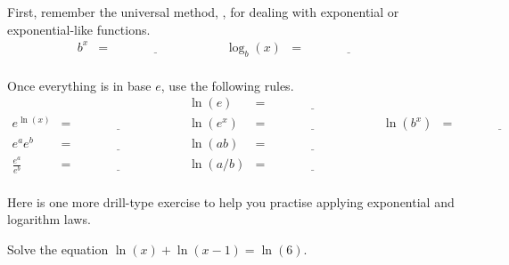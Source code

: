 \documentclass[../main.tex]{subfiles}
\begin{document}
\begin{exercise}
  First, remember the universal method, , for dealing with exponential or exponential-like functions.
  \[
    \begin{array}{rclcrcl}
      b^{x} &=& \underline{\hspace{1in}}
      &\hspace{1em} &
      \log_{b}(x) &=& \underline{\hspace{1in}} \\[2ex]
    \end{array}
  \]

  Once everything is in base \(e\), use the following rules.
  \[
    \begin{array}{rclcrclcrcl}
      && & &
      \ln(e) &=& \underline{\hspace{1in}} &\hspace{1em} & \\[2ex]
      e^{\ln(x)} &=& \underline{\hspace{1in}}
      &\hspace{1em} &
      \ln(e^{x}) &=& \underline{\hspace{1in}}
      &\hspace{1em} &
      \ln(b^{x}) &=& \underline{\hspace{1in}}
      \\[2ex]
      e^{a} e^{b} &=& \underline{\hspace{1in}}
      &\hspace{1em} &
      \ln(ab) &=& \underline{\hspace{1in}} \\[2ex]
      \frac{e^{a}}{e^{b}} &=& \underline{\hspace{1in}}
      &\hspace{1em} &
      \ln(a/b) &=& \underline{\hspace{1in}} \\[2ex]
    \end{array}
  \]
\end{exercise}

Here is one more drill-type exercise to help you practise applying exponential and logarithm laws.
\begin{exercise}
  Solve the equation \(\ln(x) + \ln(x-1) = \ln(6)\).

  \blanks*
\end{exercise}




\end{document}
